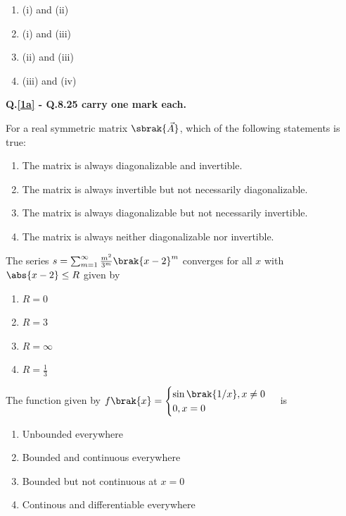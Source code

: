         \begin{enumerate}
            \item (i) and (ii)
            \item (i) and (iii)
            \item (ii) and (iii)
            \item (iii) and (iv)
        \end{enumerate} 

    \item[] \textbf{Q.\ref{1a} - Q.8.25 carry one mark each.}
        \item \label{1a} For a real symmetric matrix $\sbrak{\vec{A}}$, which of the following statements is true:
            \begin{enumerate}
                \item The matrix is always diagonalizable and invertible.
                \item The matrix is always invertible but not necessarily diagonalizable.
                \item The matrix is always diagonalizable but not necessarily invertible.
                \item The matrix is always neither diagonalizable nor invertible.
            \end{enumerate}

        \item The series $s = \sum_{m=1}^{\infty} \frac{m^2}{3^m} \brak{x-2}^m$ converges for all $x$ with $\abs{x-2} \leq R$ given by 
            \begin{enumerate}
                \item $R=0$
                \item $R=3$
                \item $R=\infty$
                \item $R=\frac{1}{3}$
            \end{enumerate}

        \item The function given by $f\brak{x} = \begin{cases}  \sin \brak{1/x}, x \neq 0 \\ 0, x=0 \end{cases}$ is
            \begin{enumerate}
                \item Unbounded everywhere
                \item Bounded and continuous everywhere
                \item Bounded but not continuous at $x=0$
                \item Continous and differentiable everywhere
            \end{enumerate}
    


